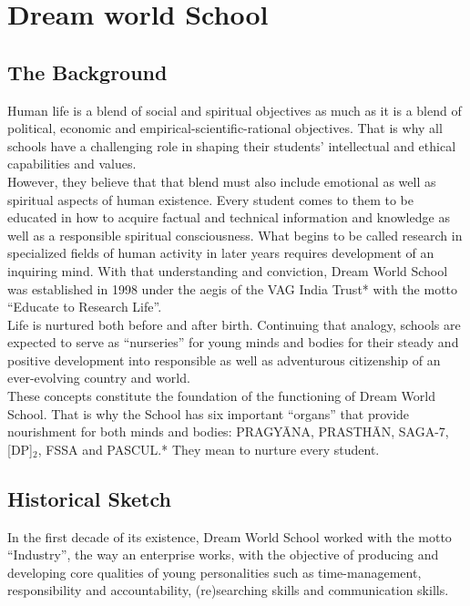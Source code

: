 \setcounter{page}{1}
\chapter{Dream world School}
\section{The Background}
Human life is a blend of social and spiritual objectives as much as it is a blend of political, economic and empirical-scientific-rational objectives. That is why all schools have a challenging role in shaping their students’ intellectual and ethical capabilities and values.\\

However,  they believe that that blend must also include emotional as well as spiritual aspects of human existence. Every student comes to them to be educated in how to acquire factual and technical information and knowledge as well as a responsible spiritual consciousness. What begins to be called research in specialized fields of human activity in later years requires development of an inquiring mind. With that understanding and conviction, Dream World School was established in 1998 under the aegis of the VAG India Trust* with the motto “Educate to Research Life”.\\

Life is nurtured both before and after birth. Continuing that analogy, schools are expected to serve as “nurseries” for young minds and bodies for their steady and positive development into responsible as well as adventurous citizenship of an ever-evolving country and world.\\

These concepts constitute the foundation of the functioning of Dream World School. That is why the School has six important “organs” that provide nourishment for both minds and bodies: PRAGYĀNA, PRASTHĀN, SAGA-7, [DP]$_2$, FSSA and PASCUL.* They mean to nurture every student.

 \section{Historical Sketch}
In the first decade of its existence, Dream World School worked with the motto “Industry”, the way an enterprise works, with the objective of producing and developing core qualities of young personalities such as time-management, responsibility and accountability, (re)searching skills and communication skills.\\

